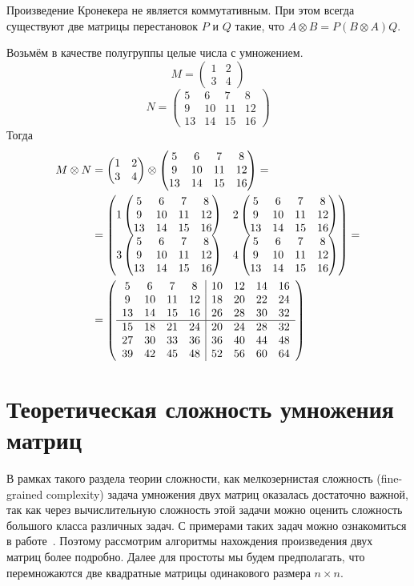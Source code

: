 \begin{note}\label{note:KronIsNotCommutative}
Произведение Кронекера не является коммутативным.
При этом всегда существуют две матрицы перестановок $P$ и $Q$ такие, что $A \otimes B = P(B \otimes A)Q$.
\end{note}

\newcommand{\examplemtrx}
{
\begin{pmatrix}
5 & 6 & 7 & 8 \\
9 & 10 & 11 & 12 \\
13 & 14 & 15 & 16
\end{pmatrix}
}

\begin{example}
Возьмём в качестве полугруппы целые числа с умножением.
$$M=
\begin{pmatrix}
1 & 2 \\
3 & 4
\end{pmatrix}
$$
$$N=\examplemtrx
$$
Тогда
\begin{align}
M \otimes N & =
\begin{pmatrix}
1 & 2 \\
3 & 4
\end{pmatrix}
\otimes
\examplemtrx = \notag \\ &=
\begin{pmatrix}
1\examplemtrx & 2\examplemtrx \\
3\examplemtrx & 4\examplemtrx
\end{pmatrix}
=\notag \\
&=
\left(\begin{array}{c c c c | c c c c}
5  & 6  & 7  & 8  & 10 & 12 & 14 & 16 \\
9  & 10 & 11 & 12 & 18 & 20 & 22 & 24 \\
13 & 14 & 15 & 16 & 26 & 28 & 30 & 32 \\
\hline
15 & 18 & 21 & 24 & 20 & 24 & 28 & 32 \\
27 & 30 & 33 & 36 & 36 & 40 & 44 & 48 \\
39 & 42 & 45 & 48 & 52 & 56 & 60 & 64
\end{array}\right)
\end{align}
\end{example}


\section{Теоретическая сложность умножения матриц}

В рамках такого раздела теории сложности, как мелкозернистая сложность (fine-grained complexity) задача умножения двух матриц оказалась достаточно важной, так как через вычислительную сложность этой задачи можно оценить сложность большого класса различных задач. С примерами таких задач можно ознакомиться в работе~\cite{Williams:2010:SEP:1917827.1918339}. Поэтому рассмотрим алгоритмы нахождения произведения двух матриц более подробно. Далее для простоты мы будем предполагать, что перемножаются две квадратные матрицы одинакового размера $n \times n$.

